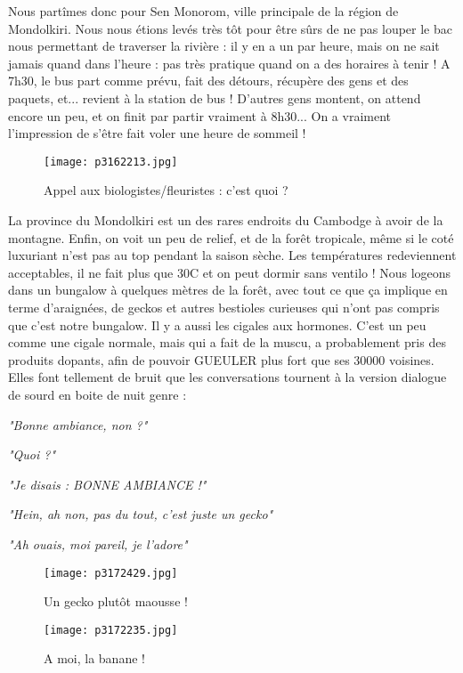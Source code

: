 \documentclass{book}
\begin{document}
Nous partîmes donc pour Sen Monorom, ville principale de la région de Mondolkiri. Nous nous étions levés très tôt pour être sûrs de ne pas louper le bac nous permettant de traverser la rivière : il y en a un par heure, mais on ne sait jamais quand dans l'heure : pas très pratique quand on a des horaires à tenir ! A 7h30, le bus part comme prévu, fait des détours, récupère des gens et des paquets, et... revient à la station de bus ! D'autres gens montent, on attend encore un peu, et on finit par partir vraiment à 8h30... On a vraiment l'impression de s'être fait voler une heure de sommeil !


\begin{figure}[h]
\centering
\texttt{[image: p3162213.jpg]}
\caption*{Appel aux biologistes/fleuristes : c'est quoi ?}
\end{figure}

La province du Mondolkiri est un des rares endroits du Cambodge à avoir de la montagne. Enfin, on voit un peu de relief, et de la forêt tropicale, même si le coté luxuriant n'est pas au top pendant la saison sèche. Les températures redeviennent acceptables, il ne fait plus que 30\textdegree C et on peut dormir sans ventilo ! Nous logeons dans un bungalow à quelques mètres de la forêt, avec tout ce que ça implique en terme d'araignées, de geckos et autres bestioles curieuses qui n'ont pas compris que c'est notre bungalow. Il y a aussi les cigales aux hormones. C'est un peu comme une cigale normale, mais qui a fait de la muscu, a probablement pris des produits dopants, afin de pouvoir GUEULER plus fort que ses 30000 voisines. Elles font tellement de bruit que les conversations tournent à la version dialogue de sourd en boite de nuit genre :

\emph{"Bonne ambiance, non ?"}

\emph{"Quoi ?"}

\emph{"Je disais : BONNE AMBIANCE !"}

\emph{"Hein, ah non, pas du tout, c'est juste un gecko"}

\emph{"Ah ouais, moi pareil, je l'adore"}


\begin{figure}[h]
\centering
\texttt{[image: p3172429.jpg]}
\caption*{Un gecko plutôt maousse !}
\end{figure}




\begin{wrapfigure}{l}{0.45\textwidth}
\centering
\texttt{[image: p3172235.jpg]}
\caption*{A moi, la banane !}
\end{wrapfigure}
\end{document}
